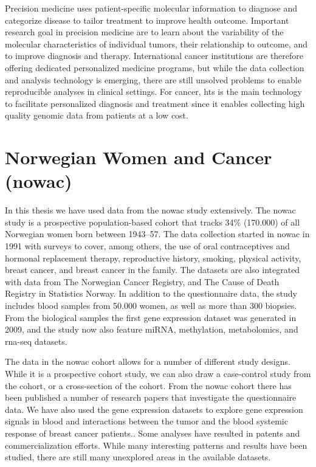 Precision medicine uses patient-specific molecular information to diagnose and
categorize disease to tailor treatment to improve health
outcome.\cite{national2011toward} Important research goal in precision medicine
are to learn about the variability of the molecular characteristics of
individual tumors, their relationship to outcome, and to improve diagnosis and
therapy.\cite{tannock2016limits} International cancer institutions are therefore
offering dedicated personalized medicine programs, but while the data collection
and analysis technology is emerging, there are still unsolved problems to enable
reproducible analyses in clinical settings. For cancer, \gls{hts}
is the main technology to facilitate personalized diagnosis and
treatment since it enables collecting high quality genomic data from patients
at a low cost. 

\section{Norwegian Women and Cancer (\gls{nowac})}
In this thesis we have used data from the \gls{nowac} study extensively. 
The \gls{nowac} study is a prospective population-based cohort that tracks 34\%
(170.000) of all Norwegian women born between 1943–57.\cite{nowac} The data
collection started in \gls{nowac} in 1991 with surveys to cover, among others,
the use of oral contraceptives and hormonal replacement therapy, reproductive
history, smoking, physical activity, breast cancer, and breast cancer in the
family. The datasets are also integrated with data from The Norwegian Cancer
Registry, and The Cause of Death Registry in Statistics Norway. In addition
to the questionnaire data, the study includes blood samples from 50.000 women,
as well as more than 300 biopsies. From the biological samples the first gene
expression dataset was generated in 2009, and the study now also feature miRNA,
methylation, metabolomics, and \gls{rna}-seq datasets. 

The data in the \gls{nowac} cohort allows for a number of different study
designs. While it is a prospective cohort study, we can also draw a case-control
study from the cohort, or a cross-section of the cohort. From the
\gls{nowac} cohort there has been published a number of research papers that
investigate the questionnaire data. We have also used the gene expression
datasets to explore gene expression signals in blood and interactions between
the tumor and the blood systemic response of breast cancer
patients.\cite{holden2017local, dumeaux2017interactions}. Some analyses
have resulted in patents\cite{blobrec} and commercialization efforts.  While
many interesting patterns and results have been studied, there are still many
unexplored areas in the available datasets.

